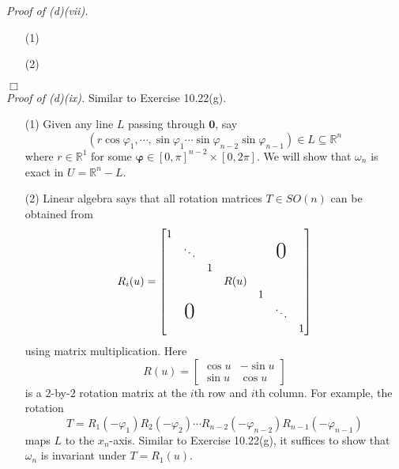 \documentclass{article}
\begin{document}
\emph{Proof of (d)(vii).}
\begin{enumerate}
\item[(1)]

\item[(2)]

\end{enumerate}
$\Box$ \\



\emph{Proof of (d)(ix).}
Similar to Exercise 10.22(g).
\begin{enumerate}
\item[(1)]
  Given any line $L$ passing through $\mathbf{0}$,
  say
  \[
    (r \cos\varphi_1, \cdots, \sin\varphi_1 \cdots \sin\varphi_{n-2} \sin\varphi_{n-1})
    \in L
    \subseteq \mathbb{R}^n
  \]
  where $r \in \mathbb{R}^1$
  for some $\bm{\varphi} \in [0,\pi]^{n-2} \times [0,2\pi]$.
  We will show that $\omega_n$ is exact in $U = \mathbb{R}^n - L$.

\item[(2)]
  Linear algebra says that all rotation matrices $T \in SO(n)$ can be obtained from
  \[
    R_i(u) = \begin{bmatrix}
      1 &               &   &      &   &               &   \\
        &        \ddots &   &      &   & \text{\huge0} &   \\
        &               & 1 &      &   &               &   \\
        &               &   & R(u) &   &               &   \\
        &               &   &      & 1 &               &   \\
        & \text{\huge0} &   &      &   &        \ddots &   \\
        &               &   &      &   &               & 1
    \end{bmatrix}
  \]
  using matrix multiplication.
  Here
  \[
    R(u) =
    \begin{bmatrix}
      \cos u & -\sin u \\
      \sin u &  \cos u
    \end{bmatrix}
  \]
  is a $2$-by-$2$ rotation matrix at the $i$th row and $i$th column.
  For example, the rotation
  \[
    T
    = R_1(-\varphi_1) R_2(-\varphi_2) \cdots
      R_{n-2}(-\varphi_{n-2}) R_{n-1}(-\varphi_{n-1})
  \]
  maps $L$ to the $x_n$-axis.
  Similar to Exercise 10.22(g), it suffices to show that $\omega_n$ is invariant under $T = R_1(u)$.


\end{enumerate}
\end{document}
